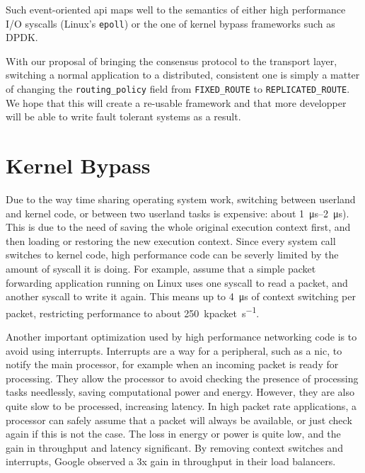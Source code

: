 Such event-oriented \gls{api} maps well to the semantics of either high performance I/O syscalls (\eg Linux's \texttt{epoll}) or the one of kernel bypass frameworks such as DPDK.

\begin{lstfloat}

\end{lstfloat}

\begin{lstfloat}

\end{lstfloat}

With our proposal of bringing the consensus protocol to the transport layer, switching a normal application to a distributed, consistent one is simply a matter of changing the \texttt{routing\_policy} field from \texttt{FIXED\_ROUTE} to \texttt{REPLICATED\_ROUTE}.
We hope that this will create a re-usable framework and that more developper will be able to write fault tolerant systems as a result.

\section{Kernel Bypass}

Due to the way time sharing operating system work, switching between userland and kernel code, or between two userland tasks is expensive: about \SIrange{1}{2}{\micro\second}\cite{measuring_context_switch}).
This is due to the need of saving the whole original execution context first, and then loading or restoring the new execution context.
Since every system call switches to kernel code, high performance code can be severly limited by the amount of syscall it is doing.
For example, assume that a simple packet forwarding application running on Linux uses one syscall to read a packet, and another syscall to write it again.
This means up to \SI{4}{\micro\second} of context switching per packet, restricting performance to about \SI{250}{\kilo packet\per\second}.

Another important optimization used by high performance networking code is to avoid using interrupts.
Interrupts are a way for a peripheral, such as a \gls{nic}, to notify the main processor, for example when an incoming packet is ready for processing.
They allow the processor to avoid checking the presence of processing tasks needlessly, saving computational power and energy.
However, they are also quite slow to be processed, increasing latency.
In high packet rate applications, a processor can safely assume that a packet will always be available, or just check again if this is not the case.
The loss in energy or power is quite low, and the gain in throughput and latency significant.
By removing context switches and interrupts, Google observed a 3x gain in throughput in their load balancers\cite{maglev}.

